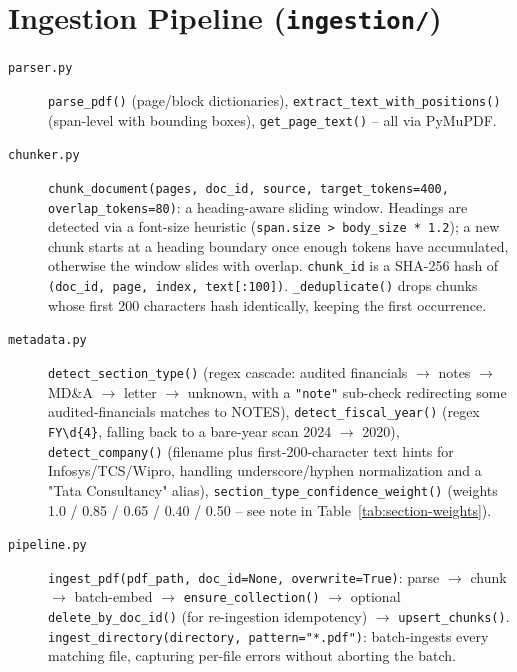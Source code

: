 \documentclass[11pt,a4paper]{report}
\newcommand{\code}[1]{\texttt{#1}}
\newcommand{\file}[1]{\texttt{\small #1}}
\begin{document}
\section{Ingestion Pipeline (\file{ingestion/})}

\begin{description}
    \item[\file{parser.py}] \code{parse\_pdf()} (page/block dictionaries),
    \code{extract\_text\_with\_positions()} (span-level with bounding boxes),
    \code{get\_page\_text()} -- all via PyMuPDF.
    \item[\file{chunker.py}] \code{chunk\_document(pages, doc\_id, source,
    target\_tokens=400, overlap\_tokens=80)}: a heading-aware sliding window. Headings
    are detected via a font-size heuristic (\code{span.size > body\_size * 1.2}); a new
    chunk starts at a heading boundary once enough tokens have accumulated, otherwise
    the window slides with overlap. \code{chunk\_id} is a SHA-256 hash of
    \code{(doc\_id, page, index, text[:100])}. \code{\_deduplicate()} drops chunks
    whose first 200 characters hash identically, keeping the first occurrence.
    \item[\file{metadata.py}] \code{detect\_section\_type()} (regex cascade: audited
    financials $\to$ notes $\to$ MD\&A $\to$ letter $\to$ unknown, with a
    \code{"note"} sub-check redirecting some audited-financials matches to NOTES),
    \code{detect\_fiscal\_year()} (regex \code{FY\textbackslash d\{4\}}, falling back
    to a bare-year scan 2024 $\to$ 2020), \code{detect\_company()} (filename plus
    first-200-character text hints for Infosys/TCS/Wipro, handling
    underscore/hyphen normalization and a "Tata Consultancy" alias),
    \code{section\_type\_confidence\_weight()} (weights 1.0 / 0.85 / 0.65 / 0.40 / 0.50
    -- see note in Table~\ref{tab:section-weights}).
    \item[\file{pipeline.py}] \code{ingest\_pdf(pdf\_path, doc\_id=None,
    overwrite=True)}: parse $\to$ chunk $\to$ batch-embed $\to$
    \code{ensure\_collection()} $\to$ optional \code{delete\_by\_doc\_id()} (for
    re-ingestion idempotency) $\to$ \code{upsert\_chunks()}.
    \code{ingest\_directory(directory, pattern="*.pdf")}: batch-ingests every matching
    file, capturing per-file errors without aborting the batch.
\end{description}
\end{document}
